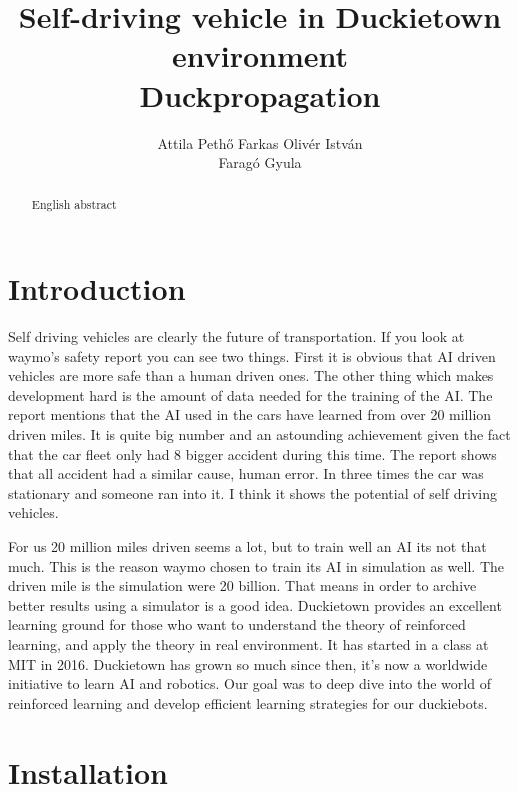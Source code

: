 \documentclass{article}
\title{Self-driving vehicle in Duckietown environment\\
	\large Duckpropagation }
\author{
  Attila Pethő
   \And  
   Farkas Olivér István \\
   \And
    Faragó Gyula\\
}
\begin{document}

\maketitle


\begin{abstract}
English abstract
\end{abstract}

\section{\large{Introduction}}

Self driving vehicles are clearly the future of transportation. If you look at waymo's \cite{waymo}  safety report you can see two things. First it is obvious that AI driven vehicles are more safe than a human driven ones. The other thing which makes development hard is the amount of data needed for the training of the AI. 
The report mentions that the AI used in the cars have learned from over 20 million driven miles. It is quite big number and an astounding achievement given the fact that the car fleet only had 8 bigger accident during this time. The report shows that all accident had a similar cause, human error. In three times the car was stationary and someone ran into it. I think it shows the potential of self driving vehicles.

For us 20 million miles driven seems a lot, but to train well an AI its not that much. This is the reason waymo chosen to train its AI in simulation as well. The driven mile is the simulation were 20 billion. That means in order to archive better results using a simulator is a good idea. Duckietown provides an excellent learning ground for those who want to understand the theory of reinforced learning, and apply the theory in real environment. 
It has started in a class at MIT in 2016. Duckietown has grown so much since then, it's now a worldwide initiative to learn AI and robotics. Our goal was to deep dive into the world of reinforced learning and develop efficient learning strategies for our duckiebots. 

\section{\large{Installation}}
\end{document}
